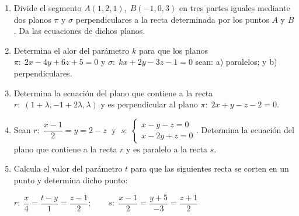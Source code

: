 \begin{enumerate}
\vspace{2mm} 
 
 \item Divide el segmento $A(1,2,1),\; B(-1,0,3)$ en tres partes iguales mediante dos planos $\pi$ y $\sigma$ perpendiculares a la recta determinada por los puntos $A$ y $B$. Da las ecuaciones de dichos planos.
 
 \vspace{2mm} 
 
 \item Determina el alor del parámetro $k$ para que los planos $\pi:\; 2x-4y+6z+5=0$ y $\sigma:\; kx+2y-3z-1=0$ sean: a) paralelos; y b) perpendiculares.
 
 \vspace{2mm} 
 
 \item Determina la ecuación del plano que contiene a la recta $r:\; (1+\lambda,-1+2\lambda,\lambda)$ y es perpendicular al plano $\pi:\; 2x+y-z-2=0$.
 
 \vspace{2mm} 
 
 \item Sean $r:\;\dfrac{x-1}{2}=y=2-z\;$ y $\;s:\; \begin{cases}x-y-z=0\\x-2y+z=0\end{cases}$. Determina la ecuación del plano  que contiene a la recta $r$ y es paralelo a la recta $s$.
 
 \vspace{2mm} 
 
 \item Calcula el valor del parámetro $t$ para que las siguientes recta se corten en un punto y determina dicho punto:
 
 $r:\; \dfrac{x}{4}=\dfrac{t-y}{1}=\dfrac{z-1}{2};\qquad s:\; \dfrac{x-1}{2}=\dfrac{y+5}{-3}=\dfrac{z+1}{2}$

\vspace{2mm} 


\end{enumerate}
